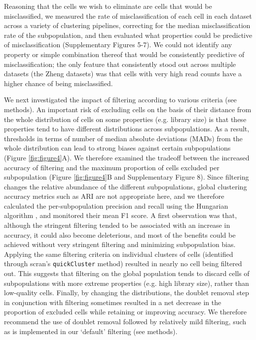 \documentclass{bmcart}
\begin{document}
Reasoning that the cells we wish to eliminate are cells that would be misclassified, we measured the rate of misclassification of each cell in each dataset across a variety of clustering pipelines, correcting for the median misclassification rate of the subpopulation, and then evaluated what properties could be predictive of misclassification (Supplementary Figures 5-7). We could not identify any property or simple combination thereof that would be consistently predictive of misclassification; the only feature that consistently stood out across multiple datasets (the Zheng datasets) was that cells with very high read counts have a higher chance of being misclassified.

We next investigated the impact of filtering according to various criteria (see methods). An important risk of excluding cells on the basis of their distance from the whole distribution of cells on some properties (e.g. library size) is that these properties tend to have different distributions across subpopulations. As a result, thresholds in terms of number of median absolute deviations (MADs) from the whole distribution can lead to strong biases against certain subpopulations (Figure \ref{fig:figure4}A). We therefore examined the tradeoff between the increased accuracy of filtering and the maximum proportion of cells excluded per subpopulation (Figure \ref{fig:figure4}B and Supplementary Figure 8). Since filtering changes the relative abundance of the different subpopulations, global clustering accuracy metrics such as ARI are not appropriate here, and we therefore calculated the per-subpopulation precision and recall using the Hungarian algorithm \citep{PapadimitriouHu1998}, and monitored their mean F1 score. A first observation was that, although the stringent filtering tended to be associated with an increase in accuracy, it could also become deleterious, and most of the benefits could be achieved without very stringent filtering and minimizing subpopulation bias. Applying the same filtering criteria on individual clusters of cells (identified through scran's \texttt{quickCluster} method) resulted in nearly no cell being filtered out. This suggests that filtering on the global population tends to discard cells of subpopulations with more extreme properties (e.g. high library size), rather than low-quality cells. Finally, by changing the distributions, the doublet removal step in conjunction with filtering sometimes resulted in a net decrease in the proportion of excluded cells while retaining or improving accuracy. We therefore recommend the use of doublet removal followed by relatively mild filtering, such as is implemented in our `default' filtering (see methods).
\end{document}
